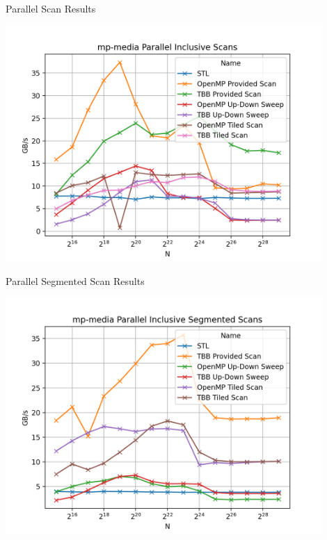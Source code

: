 \begin{frame}{Parallel Scan Results}
 
  \centering
  \vspace{-5pt}
  \includegraphics[width=0.90\textwidth]{"graphs/mp-media Parallel Inclusive Scans"}
 
\end{frame}

\begin{frame}{Parallel Segmented Scan Results}
 
  \centering
  \vspace{-5pt}
  \includegraphics[width=0.90\textwidth]{"graphs/mp-media Parallel Inclusive Segmented Scans"}
 
\end{frame}



